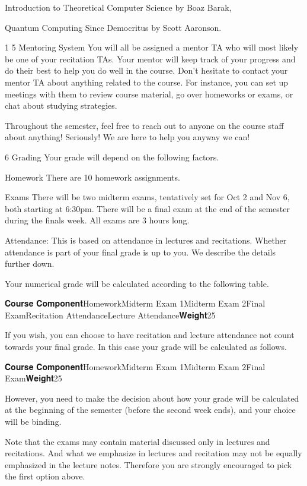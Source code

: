 Introduction to Theoretical Computer Science by Boaz Barak,

Quantum Computing Since Democritus by Scott Aaronson.

 1
5  Mentoring System
You will all be assigned a mentor TA who will most likely be one of your recitation TAs. Your mentor will keep track of your progress and do their best to help you do well in the course. Don’t hesitate to contact your mentor TA about anything related to the course. For instance, you can set up meetings with them to review course material, go over homeworks or exams, or chat about studying strategies.

Throughout the semester, feel free to reach out to anyone on the course staff about anything! Seriously! We are here to help you anyway we can!

 
6  Grading
Your grade will depend on the following factors.

Homework There are 10 homework assignments.

Exams There will be two midterm exams, tentatively set for Oct 2 and Nov 6, both starting at 6:30pm. There will be a final exam at the end of the semester during the finals week. All exams are 3 hours long.

Attendance: This is based on attendance in lectures and recitations. Whether attendance is part of your final grade is up to you. We describe the details further down.

Your numerical grade will be calculated according to the following table.

𝐂𝐨𝐮𝐫𝐬𝐞 𝐂𝐨𝐦𝐩𝐨𝐧𝐞𝐧𝐭HomeworkMidterm Exam 1Midterm Exam 2Final ExamRecitation AttendanceLecture Attendance𝐖𝐞𝐢𝐠𝐡𝐭25%

If you wish, you can choose to have recitation and lecture attendance not count towards your final grade. In this case your grade will be calculated as follows.

𝐂𝐨𝐮𝐫𝐬𝐞 𝐂𝐨𝐦𝐩𝐨𝐧𝐞𝐧𝐭HomeworkMidterm Exam 1Midterm Exam 2Final Exam𝐖𝐞𝐢𝐠𝐡𝐭25%

However, you need to make the decision about how your grade will be calculated at the beginning of the semester (before the second week ends), and your choice will be binding.

Note that the exams may contain material discussed only in lectures and recitations. And what we emphasize in lectures and recitation may not be equally emphasized in the lecture notes. Therefore you are strongly encouraged to pick the first option above.

